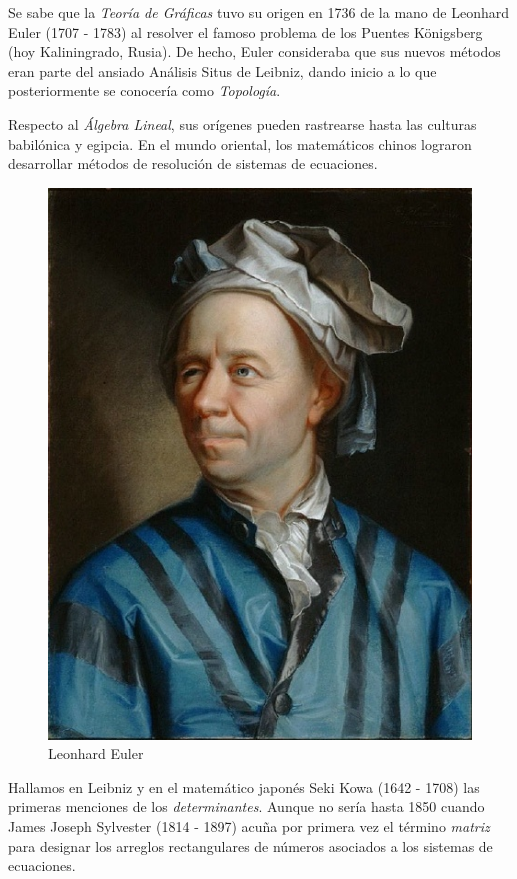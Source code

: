     Se sabe que la \textit{Teoría de Gráficas} tuvo su origen en 1736 de la mano de Leonhard Euler (1707 - 1783) al resolver el famoso problema de los Puentes Königsberg (hoy Kaliningrado, Rusia). De hecho, Euler consideraba que sus nuevos métodos eran parte del ansiado Análisis Situs de Leibniz, dando inicio a lo que posteriormente se conocería como \textit{Topología}.

    Respecto al \textit{Álgebra Lineal}, sus orígenes pueden rastrearse hasta las culturas babilónica y egipcia. En el mundo oriental, los matemáticos chinos lograron desarrollar métodos de resolución de sistemas de ecuaciones. 

\begin{figure}
    \centering
    \includegraphics[scale=0.4]{img/imgintro/euler.jpg}
    \caption{Leonhard Euler}
    \label{fig:euler}   
\vspace{-0.5cm}
\end{figure}

Hallamos en Leibniz y en el matemático japonés Seki Kowa (1642 - 1708) las primeras menciones de los \textit{determinantes}. Aunque no sería hasta 1850 cuando James Joseph Sylvester (1814 - 1897) acuña por primera vez el término \textit{matriz} para designar los arreglos rectangulares de números asociados a los sistemas de ecuaciones.

